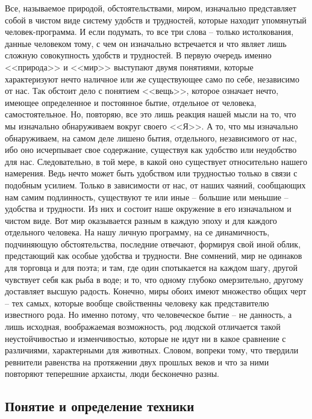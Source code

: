 Все, называемое природой, обстоятельствами, миром, изначально представляет 
собой в чистом виде систему удобств и трудностей, которые находит упомянутый 
человек-программа. И если подумать, то все три слова -- только 
истолкования, данные человеком тому, с чем он изначально встречается и что 
являет лишь сложную совокупность удобств и трудностей. В первую очередь именно 
<<природа>> и <<мир>> выступают двумя понятиями, которые характеризуют нечто 
наличное или же существующее само по себе, независимо от нас. Так обстоит 
дело с понятием <<вещь>>, которое означает нечто, имеющее определенное и 
постоянное бытие, отдельное от человека, самостоятельное. Но, повторяю, все 
это лишь реакция нашей мысли на то, что мы изначально обнаруживаем вокруг 
своего <<Я>>. А то, что мы изначально обнаруживаем, на самом деле лишено 
бытия, отдельного, независимого от нас, ибо оно исчерпывает свое содержание, 
существуя как удобство или неудобство для нас. Следовательно, в той мере, в 
какой оно существует относительно нашего намерения. Ведь нечто может быть 
удобством или трудностью только в связи с подобным усилием. Только в 
зависимости от нас, от наших чаяний, сообщающих нам самим подлинность, 
существуют те или иные -- большие или меньшие -- удобства и трудности. Из них 
и состоит наше окружение в его изначальном и чистом виде. Вот мир оказывается 
разным в каждую эпоху и для каждого отдельного человека. На нашу личную 
программу, на се динамичность, подчиняющую обстоятельства, последние отвечают, 
формируя свой иной облик, предстающий как особые удобства и трудности. Вне 
сомнений, мир не одинаков для торговца и для поэта; и там, где один 
спотыкается на каждом шагу, другой чувствует себя как рыба в воде; и то, что 
одному глубоко омерзительно, другому доставляет высшую радость. Конечно, миры 
обоих имеют множество общих черт -- тех самых, которые вообще свойственны 
человеку как представителю известного рода. Но именно потому, что человеческое 
бытие -- не данность, а лишь исходная, воображаемая возможность, род людской 
отличается такой неустойчивостью и изменчивостью, которые не идут ни в какое 
сравнение с различиями, характерными для животных. Словом, вопреки тому, что 
твердили ревнители равенства на протяжении двух прошлых веков и что за ними 
повторяют теперешние архаисты, люди бесконечно разны. \cite{bib:04}

\subsection{Понятие и определение техники}

